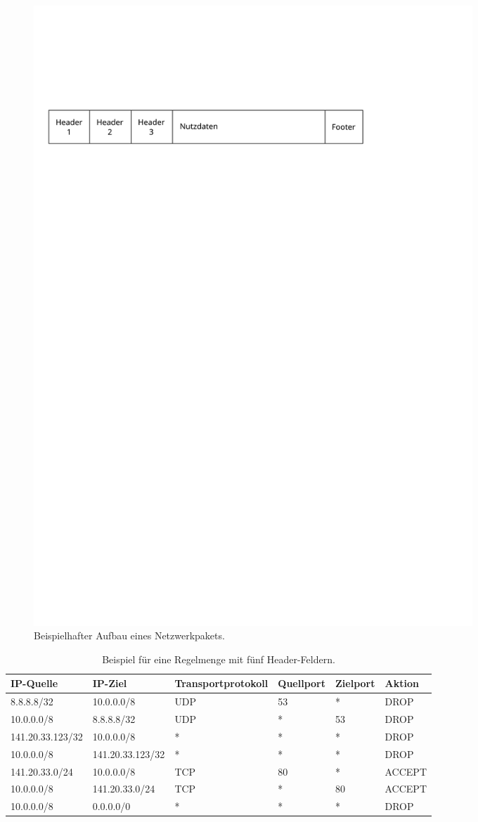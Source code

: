 \documentclass[xcolor=x11names,compress]{beamer}
\renewcommand{\(}{\begin{columns}}
\renewcommand{\)}{\end{columns}}
\newcommand{\<}[1]{\begin{column}{#1}}
\renewcommand{\>}{\end{column}}
\begin{document}
\begin{frame}
  \begin{figure}
  \centering
  \includegraphics[width=0.8\textwidth]{figures/paketheader}
  \caption{Beispielhafter Aufbau eines Netzwerkpakets.}
  \end{figure}
  \pause
  \tiny
  \begin{table}
  \begin{tabularx}{\textwidth}{XXXXX|X}
    IP-Quelle&IP-Ziel&Transport\-protokoll&Quellport&Zielport&Aktion\\
    \hline
    8.8.8.8/32&10.0.0.0/8&UDP&53&*&\textsc{DROP}\\
    10.0.0.0/8&8.8.8.8/32&UDP&*&53&\textsc{DROP}\\
    141.20.33.123/32&10.0.0.0/8&*&*&*&\textsc{DROP}\\
    10.0.0.0/8&141.20.33.123/32&*&*&*&\textsc{DROP}\\
    141.20.33.0/24&10.0.0.0/8&TCP&80&*&\textsc{ACCEPT}\\
    10.0.0.0/8&141.20.33.0/24&TCP&*&80&\textsc{ACCEPT}\\
    10.0.0.0/8&0.0.0.0/0&*&*&*&\textsc{DROP}
  \end{tabularx}
  \caption{Beispiel für eine Regelmenge mit fünf Header-Feldern.}
  \end{table}
  \normalsize
\end{frame}
\end{document}
